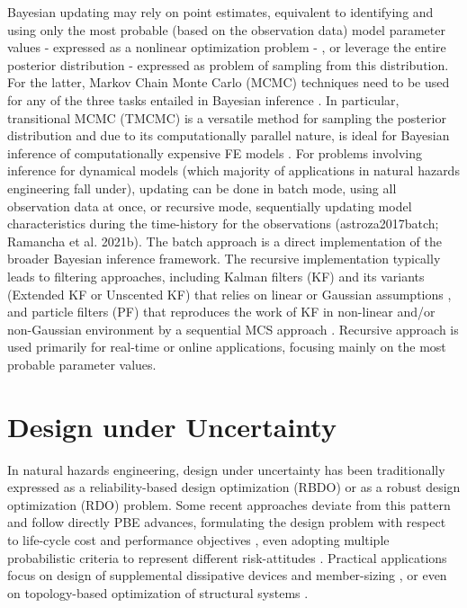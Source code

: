 Bayesian updating may rely on point estimates, equivalent to identifying and using only the most probable (based on the observation data) model parameter values - expressed as a nonlinear optimization problem - , or leverage the entire posterior distribution - expressed as problem of sampling from this distribution. For the latter, Markov Chain Monte Carlo (MCMC) techniques need to be used for any of the three tasks entailed in Bayesian inference \citep{catanach2018bayesian}. In particular, transitional MCMC (TMCMC) is a versatile method for sampling the posterior distribution \citep{ching2007transitional,betz2016transitional} and due to its computationally parallel nature, is ideal for Bayesian inference of computationally expensive FE models \citep{ramancha2021bayesian, ramancha2021bayesianupdating}. For problems involving inference for dynamical models (which majority of applications in natural hazards engineering fall under), updating can be done in batch mode, using all observation data at once, or recursive mode, sequentially updating model characteristics during the time-history for the observations (astroza2017batch; Ramancha et al. 2021b). The batch approach is a direct implementation of the broader Bayesian inference framework. The recursive implementation typically leads to filtering approaches, including Kalman filters (KF) and its variants (Extended KF or Unscented KF) that relies on linear or Gaussian assumptions \citep{astroza2017batch,kontoroupi2017online,erazo2018bayesian}, and particle filters (PF) that reproduces the work of KF in non-linear and/or non-Gaussian environment by a sequential MCS approach \citep{chatzi2009unscented, wei2013dynamic, olivier2017particle}. Recursive approach is used primarily for real-time or online applications, focusing mainly on the most probable parameter values. 

\section{Design under Uncertainty}
\label{sec:uq_design}

In natural hazards engineering, design under uncertainty has been traditionally expressed as a reliability-based design optimization (RBDO) \citep{spence2012large, chun2019systemreliabilitybased} or as a robust design optimization (RDO) \citep{greco2015robust} problem. Some recent approaches deviate from this pattern and follow directly PBE advances, formulating the design problem with respect to life-cycle cost and performance objectives \citep{shin2014minimum}, even adopting multiple probabilistic criteria to represent different risk-attitudes \citep{haukaas2012reliabilitybased, gidaris2017multiobjective, li2018probabilistic, deb2019simplified}. Practical applications focus on design of supplemental dissipative devices \citep{shin2014minimum, gidaris2017multiobjective, altieri2018reliabilitybased} and member-sizing \citep{huang2015performancebased, suksuwan2018optimization}, or even on topology-based optimization of structural systems \citep{bobby2017reliabilitybased, zhu2017topology}.

